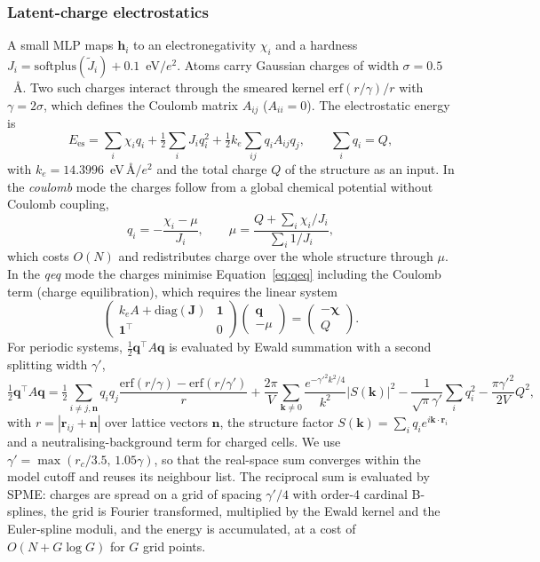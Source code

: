 \documentclass[journal=jctcce,manuscript=article,layout=traditional]{achemso}
\newcommand{\vect}[1]{\bm{#1}}
\begin{document}
\subsubsection{Latent-charge electrostatics}
A small MLP maps $\vect h_i$ to an electronegativity $\chi_i$ and a hardness $J_i=\mathrm{softplus}(\tilde J_i)
+0.1$~eV$/e^2$. Atoms carry Gaussian charges of width $\sigma=0.5$~\AA. Two such charges interact through the
smeared kernel $\mathrm{erf}(r/\gamma)/r$ with $\gamma=2\sigma$, which defines the Coulomb matrix $A_{ij}$
($A_{ii}=0$). The electrostatic energy is
\begin{equation}
E_\text{es}=\sum_i\chi_iq_i+\tfrac12\sum_iJ_iq_i^2+\tfrac12k_e\sum_{ij}q_iA_{ij}q_j,\qquad \sum_iq_i=Q,
\label{eq:qeq}
\end{equation}
with $k_e=14.3996$~eV\,\AA$/e^2$ and the total charge $Q$ of the structure as an input. In the \emph{coulomb} mode
the charges follow from a global chemical potential without Coulomb coupling,
\begin{equation}
q_i=-\frac{\chi_i-\mu}{J_i},\qquad \mu=\frac{Q+\sum_i\chi_i/J_i}{\sum_i1/J_i},
\end{equation}
which costs $O(N)$ and redistributes charge over the whole structure through $\mu$. In the \emph{qeq} mode the
charges minimise Equation~\ref{eq:qeq} including the Coulomb term (charge equilibration\cite{rappe1991qeq,ko2021}), which
requires the linear system
\begin{equation}
\begin{pmatrix}k_eA+\mathrm{diag}(\vect J)&\vect 1\\ \vect 1^\top&0\end{pmatrix}
\begin{pmatrix}\vect q\\ -\mu\end{pmatrix}=\begin{pmatrix}-\boldsymbol\chi\\ Q\end{pmatrix}.
\end{equation}
For periodic systems, $\tfrac12\vect q^\top A\vect q$ is evaluated by Ewald summation\cite{ewald1921} with a second
splitting width $\gamma'$,
\begin{equation}
\tfrac12\vect q^\top A\vect q=\tfrac12\sum_{i\ne j,\vect n}q_iq_j\frac{\mathrm{erf}(r/\gamma)-\mathrm{erf}(r/\gamma')}{r}
+\frac{2\pi}{V}\sum_{\vect k\ne0}\frac{e^{-\gamma'^2k^2/4}}{k^2}\big|S(\vect k)\big|^2
-\frac{1}{\sqrt\pi\gamma'}\sum_iq_i^2-\frac{\pi\gamma'^2}{2V}Q^2,
\label{eq:ewald}
\end{equation}
with $r=|\vect r_{ij}+\vect n|$ over lattice vectors $\vect n$, the structure factor
$S(\vect k)=\sum_iq_ie^{i\vect k\cdot\vect r_i}$ and a neutralising-background term for charged cells. We use
$\gamma'=\max(r_c/3.5,\,1.05\gamma)$, so that the real-space sum converges within the model cutoff and reuses its
neighbour list. The reciprocal sum is evaluated by SPME\cite{darden1993pme,essmann1995spme}: charges are spread on a
grid of spacing $\gamma'/4$ with order-4 cardinal B-splines, the grid is Fourier transformed, multiplied by the
Ewald kernel and the Euler-spline moduli, and the energy is accumulated, at a cost of $O(N+G\log G)$ for $G$ grid
points.
\end{document}
